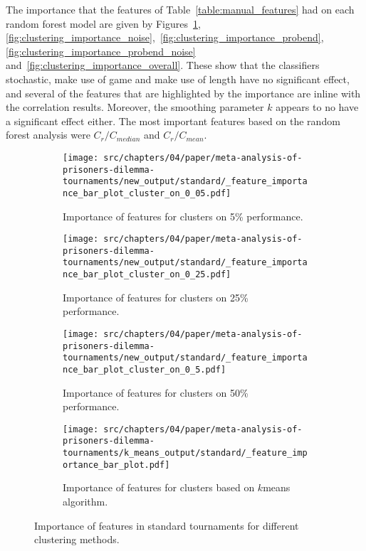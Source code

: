 The importance that the features of Table~\ref{table:manual_features} had on
each random forest model are given by Figures~\ref{fig:clustering_importance_standard},
\ref{fig:clustering_importance_noise},~\ref{fig:clustering_importance_probend},
\ref{fig:clustering_importance_probend_noise}
and~\ref{fig:clustering_importance_overall}. These show that the classifiers
stochastic, make use of game and make use of length have no significant effect,
and several of the features that are highlighted by the importance are inline with
the correlation results. Moreover, the smoothing parameter \(k\) appears to no
have a significant effect either. The most important features based on the
random forest analysis were $C_{r} / C_{median}$ and $C_r / C_{mean}$.

\begin{figure}[!htbp]
    \begin{subfigure}[t]{0.5\textwidth}
        \begin{center}
            \texttt{[image: src/chapters/04/paper/meta-analysis-of-prisoners-dilemma-tournaments/new\_output/standard/\_feature\_importance\_bar\_plot\_cluster\_on\_0\_05.pdf]}
        \end{center}
        \caption{Importance of features for clusters on 5\% performance.}
    \end{subfigure}\hfill
    \begin{subfigure}[t]{0.5\textwidth}
        \begin{center}
            \texttt{[image: src/chapters/04/paper/meta-analysis-of-prisoners-dilemma-tournaments/new\_output/standard/\_feature\_importance\_bar\_plot\_cluster\_on\_0\_25.pdf]}
        \end{center}
        \caption{Importance of features for clusters on 25\% performance.}
    \end{subfigure}
    \begin{subfigure}[t]{0.5\textwidth}
        \begin{center}
            \texttt{[image: src/chapters/04/paper/meta-analysis-of-prisoners-dilemma-tournaments/new\_output/standard/\_feature\_importance\_bar\_plot\_cluster\_on\_0\_5.pdf]}
        \end{center}
        \caption{Importance of features for clusters on 50\% performance.}
    \end{subfigure}\hfill
    \begin{subfigure}[t]{0.5\textwidth}
        \begin{center}
            \texttt{[image: src/chapters/04/paper/meta-analysis-of-prisoners-dilemma-tournaments/k\_means\_output/standard/\_feature\_importance\_bar\_plot.pdf]}
        \end{center}
        \caption{Importance of features for clusters based on \(k\)means algorithm.}
    \end{subfigure}
    \caption{Importance of features in standard tournaments for different
    clustering methods.}\label{fig:clustering_importance_standard}
\end{figure}


